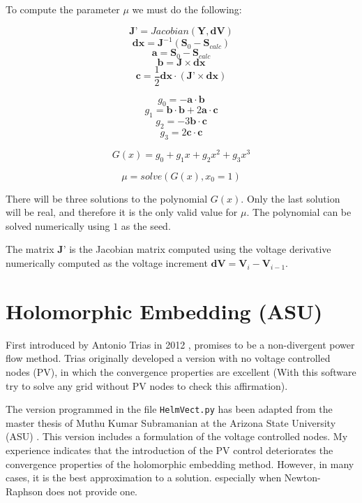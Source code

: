 \documentclass[11pt,fleqn]{book} %
\begin{document}
To compute the parameter $\mu$ we must do the following:

\begin{theorem}[Computation of $\mu$]
$$\textbf{J'} = Jacobian(\textbf{Y}, \textbf{dV})$$
$$\textbf{dx} = \textbf{J}^{-1}(\textbf{S}_0 - \textbf{S}_{calc})$$
$$\textbf{a} = \textbf{S}_0 - \textbf{S}_{calc}$$
$$\textbf{b} = \textbf{J} \times \textbf{dx}$$
$$\textbf{c} = \frac{1}{2} \textbf{dx} \cdot (\textbf{J'} \times \textbf{dx})$$

$$g_0 = -\textbf{a} \cdot \textbf{b}$$
$$g_1 = \textbf{b} \cdot \textbf{b} + 2  \textbf{a} \cdot \textbf{c}$$
$$g_2 = -3  \textbf{b} \cdot \textbf{c}$$
$$g_3 = 2  \textbf{c} \cdot \textbf{c}$$

$$G(x) = g_0 + g_1x + g_2x^2 + g_3x^3$$

$$\mu = solve(G(x), x_0=1)$$
\end{theorem}


There will be three solutions to the polynomial $G(x)$. Only the last solution will be real, and therefore it is the only valid value for $\mu$.
The polynomial can be solved numerically using $1$ as the seed.

The matrix $\textbf{J'}$ is the Jacobian matrix computed using the voltage derivative numerically computed as the voltage increment $\textbf{dV}= \textbf{V}_{i} - \textbf{V}_{i-1}$.  

\newpage
\section{Holomorphic Embedding (ASU)}

First introduced by Antonio Trias in 2012 \cite{TriasHELM}, promises to be a non-divergent power flow method. Trias originally developed a version with no voltage controlled nodes (PV), in which the convergence properties are excellent (With this software try to solve any grid without PV nodes to check this affirmation). 

The version programmed in the file \verb|HelmVect.py| has been adapted from the master thesis of Muthu Kumar Subramanian at the Arizona State University (ASU) \cite{subramanian2014application}. This version includes a formulation of the voltage controlled nodes. My experience indicates that the introduction of the PV control deteriorates the convergence properties of the holomorphic embedding method. However, in many cases, it is the best approximation to a solution. especially when Newton-Raphson does not provide one.
\end{document}

